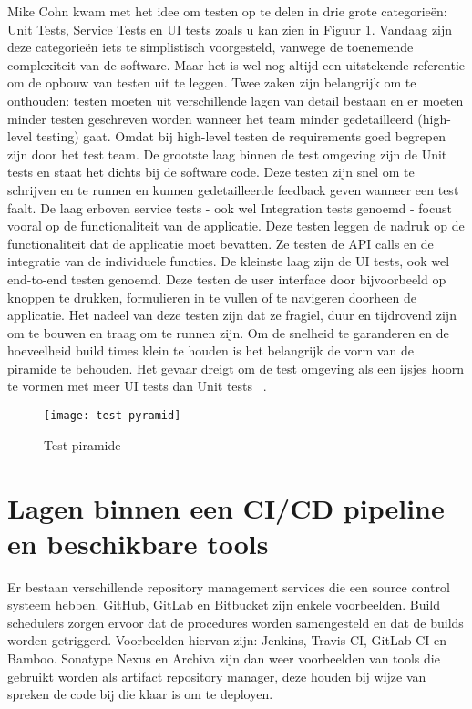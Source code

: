     Mike Cohn kwam met het idee om testen op te delen in drie grote categorieën: Unit Tests, Service Tests en UI tests zoals u kan zien in Figuur \ref{img-test-pyramid}.
    Vandaag zijn deze categorieën iets te simplistisch voorgesteld, vanwege de toenemende complexiteit van de software. Maar het is wel nog altijd een uitstekende referentie om de opbouw van testen uit te leggen.
    Twee zaken zijn belangrijk om te onthouden: testen moeten uit verschillende lagen van detail bestaan en er moeten minder testen geschreven worden wanneer het team minder gedetailleerd (high-level testing) gaat. Omdat bij high-level testen de requirements goed begrepen zijn door het test team.
    De grootste laag binnen de test omgeving zijn de Unit tests en staat het dichts bij de software code. Deze testen zijn snel om te schrijven en te runnen en kunnen gedetailleerde feedback geven wanneer een test faalt.
    De laag erboven service tests - ook wel Integration tests genoemd - focust vooral op de functionaliteit van de applicatie.
    Deze testen leggen de nadruk op de functionaliteit dat de applicatie moet bevatten. Ze testen de API calls en de integratie van de individuele functies.
    De kleinste laag zijn de UI tests, ook wel end-to-end testen genoemd. Deze testen de user interface door bijvoorbeeld op knoppen te drukken, formulieren in te vullen of te navigeren doorheen de applicatie. Het nadeel van deze testen zijn dat ze fragiel, duur en tijdrovend zijn om te bouwen en traag om te runnen zijn.
    Om de snelheid te garanderen en de hoeveelheid build times klein te houden is het belangrijk de vorm van de piramide te behouden. Het gevaar dreigt om de test omgeving als een ijsjes hoorn te vormen met meer UI tests dan Unit tests ~\autocite{Fowler2012}.
    \begin{figure}	
        \texttt{[image: test-pyramid]}
        \caption{Test piramide ~\autocite{Vocke2018}} \label{img-test-pyramid}
    \end{figure}

\section{Lagen binnen een CI/CD pipeline en beschikbare tools}
\label{sec:lagen-binnen-pipeline}
Er bestaan verschillende repository management services die een source control systeem hebben. GitHub, GitLab en Bitbucket zijn enkele voorbeelden.
Build schedulers zorgen ervoor dat de procedures worden samengesteld en dat de builds worden getriggerd. Voorbeelden hiervan zijn: Jenkins, Travis CI, GitLab-CI en Bamboo. Sonatype Nexus en Archiva zijn dan weer voorbeelden van tools die gebruikt worden als artifact repository manager, deze houden bij wijze van spreken de code bij die klaar is om te deployen. 

